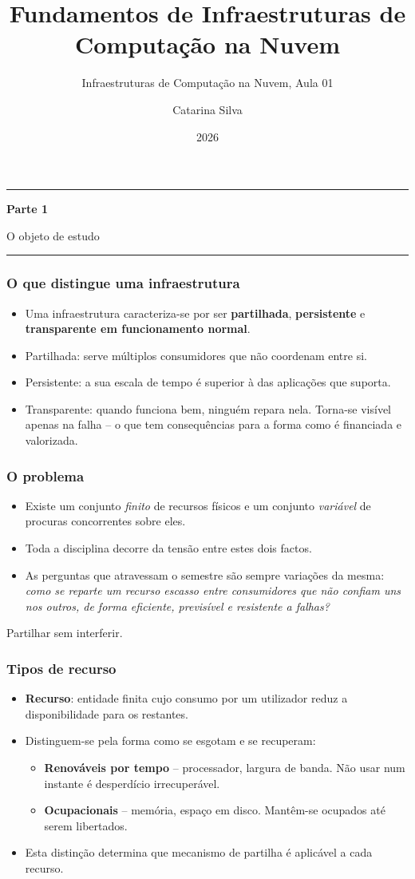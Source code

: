 \documentclass[aspectratio=169]{beamer}
\title{Fundamentos de Infraestruturas de Computação na Nuvem}
\subtitle{Infraestruturas de Computação na Nuvem, Aula 01}
\author{Catarina Silva}
\institute{ESTGA, Universidade de Aveiro}
\date{2026}
\newenvironment{ideiachave}{
  \vspace{0.5cm}
  \begin{center}
  \color{TextEspresso}
  \itshape\Large
}{
  \end{center}
  \vspace{0.5cm}
}
\newcommand{\seccao}[2]{%
  \begin{frame}[plain]
    \vspace*{2.2cm}
    \begin{center}
      {\color{NudeTaupe}\rule{3cm}{0.5pt}}\par
      \vspace{0.6cm}
      {\Huge\bfseries\textcolor{TextEspresso}{#1}}\par
      \vspace{0.5cm}
      {\large\textcolor{NudeTaupe}{#2}}\par
      \vspace{0.6cm}
      {\color{NudeTaupe}\rule{3cm}{0.5pt}}
    \end{center}
  \end{frame}
}
\begin{document}
\begin{frame}[plain]
  \titlepage
\end{frame}


\seccao{Parte 1}{O objeto de estudo}

\begin{frame}
\frametitle{O que distingue uma infraestrutura}
\begin{itemize}
    \setlength\itemsep{0.35cm}
    \item Uma infraestrutura caracteriza-se por ser \textbf{partilhada}, \textbf{persistente} e \textbf{transparente em funcionamento normal}.
    \item Partilhada: serve múltiplos consumidores que não coordenam entre si.
    \item Persistente: a sua escala de tempo é superior à das aplicações que suporta.
    \item Transparente: quando funciona bem, ninguém repara nela. Torna-se visível apenas na falha -- o que tem consequências para a forma como é financiada e valorizada.
\end{itemize}
\end{frame}

\begin{frame}
\frametitle{O problema}
\begin{itemize}
    \setlength\itemsep{0.4cm}
    \item Existe um conjunto \emph{finito} de recursos físicos e um conjunto \emph{variável} de procuras concorrentes sobre eles.
    \item Toda a disciplina decorre da tensão entre estes dois factos.
    \item As perguntas que atravessam o semestre são sempre variações da mesma: \emph{como se reparte um recurso escasso entre consumidores que não confiam uns nos outros, de forma eficiente, previsível e resistente a falhas?}
\end{itemize}
\begin{ideiachave}
Partilhar sem interferir.
\end{ideiachave}
\end{frame}

\begin{frame}
\frametitle{Tipos de recurso}
\begin{itemize}
    \setlength\itemsep{0.3cm}
    \item \textbf{Recurso}: entidade finita cujo consumo por um utilizador reduz a disponibilidade para os restantes.
    \item Distinguem-se pela forma como se esgotam e se recuperam:
    \begin{itemize}
      \item \textbf{Renováveis por tempo} -- processador, largura de banda. Não usar num instante é desperdício irrecuperável.
      \item \textbf{Ocupacionais} -- memória, espaço em disco. Mantêm-se ocupados até serem libertados.
    \end{itemize}
    \item Esta distinção determina que mecanismo de partilha é aplicável a cada recurso.
\end{itemize}
\end{frame}
\end{document}
